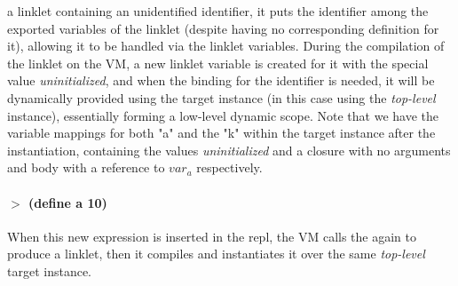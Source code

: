 a linklet containing an unidentified identifier, it puts the
identifier among the exported variables of the linklet (despite having
no corresponding definition for it), allowing it to be handled via the
linklet variables. During the compilation of the linklet on the VM, a
new linklet variable is created for it with the special value
\emph{uninitialized}, and when the binding for the identifier is
needed, it will be dynamically provided using the target instance (in
this case using the \emph{top-level} instance), essentially forming a
low-level dynamic scope. Note that we have the variable mappings for
both "a" and the "k" within the target instance after the
instantiation, containing the values \emph{uninitialized} and a
closure with no arguments and body with a reference to $var_a$
respectively.
\vspace{-0.25cm}
\paragraph{$>$ (define a 10)}

When this new expression is inserted in the repl, the VM calls the
 again to produce a linklet, then it compiles and
instantiates it over the same \emph{top-level} target instance.

\vspace{-0.3cm}

